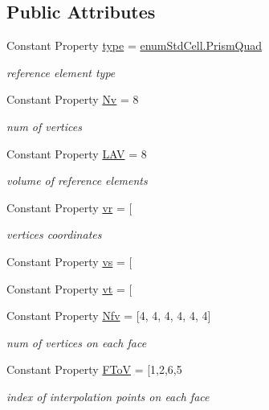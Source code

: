 \subsection*{Public Attributes}
\begin{DoxyCompactItemize}
\item 
Constant Property \hyperlink{class_std_prism_quad_a442c2455623d7488a3313b712e0cc8f4}{type} = \hyperlink{classenum_std_cell_ac4c2fa4e189e76e103f3ff9b1d19b9e7aeed411017d3367dd2c36b851be8666ea}{enum\+Std\+Cell.\+Prism\+Quad}
\begin{DoxyCompactList}\small\item\em reference element type \end{DoxyCompactList}\item 
Constant Property \hyperlink{class_std_prism_quad_ad08620e46a01c11d0bcb3d9faff3ec3a}{Nv} = 8
\begin{DoxyCompactList}\small\item\em num of vertices \end{DoxyCompactList}\item 
Constant Property \hyperlink{class_std_prism_quad_ab30d81bd88735de126b2563b6781fa78}{L\+AV} = 8
\begin{DoxyCompactList}\small\item\em volume of reference elements \end{DoxyCompactList}\item 
Constant Property \hyperlink{class_std_prism_quad_adabf544f965c2c209ad025e0aa49f6fe}{vr} = \mbox{[}
\begin{DoxyCompactList}\small\item\em vertices coordinates \end{DoxyCompactList}\item 
Constant Property \hyperlink{class_std_prism_quad_a399d0136b948c7a3c9fcc915e6274f29}{vs} = \mbox{[}
\item 
Constant Property \hyperlink{class_std_prism_quad_aca67d5344c1a409f83fc41ecef6f810d}{vt} = \mbox{[}
\item 
Constant Property \hyperlink{class_std_prism_quad_a5ba7e8b74267e912e00cad438670e421}{Nfv} = \mbox{[}4, 4, 4, 4, 4, 4\mbox{]}
\begin{DoxyCompactList}\small\item\em num of vertices on each face \end{DoxyCompactList}\item 
Constant Property \hyperlink{class_std_prism_quad_a41a4b977a4533a44e963e448306f0b4f}{F\+ToV} = \mbox{[}1,2,6,5
\begin{DoxyCompactList}\small\item\em index of interpolation points on each face \end{DoxyCompactList}\item 

\end{DoxyCompactItemize}
